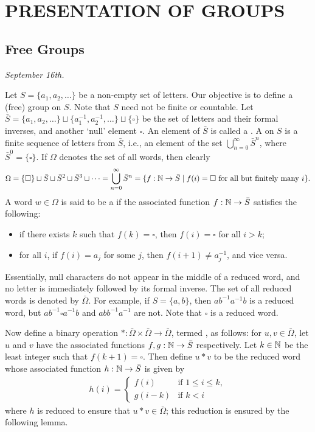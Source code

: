 \chapter{PRESENTATION OF GROUPS}


\section{Free Groups}

\textit{September 16th.}

Let $S = \{a_{1},a_{2},\ldots\}$ be a non-empty set of letters. Our objective is to define a (free) group on $S$. Note that $S$ need not be finite or countable. Let $\bar{S} = \{a_{1},a_{2},\ldots\} \sqcup \{a_{1}^{-1},a_{2}^{-1},\ldots\} \sqcup \{\square\}$ be the set of letters and their formal inverses, and another `null' element $\square$. An element of $\bar{S}$ is called a . A  on $S$ is a finite sequence of letters from $\bar{S}$, i.e., an element of the set $\bigcup_{n=0}^{\infty} \bar{S}^{n}$, where $\bar{S}^{0} = \{\square\}$. If $\Omega$ denotes the set of all words,
then clearly
\begin{align}
    \Omega = \{\square\} \sqcup \bar{S} \sqcup \bar{S}^{2} \sqcup \bar{S}^{3} \sqcup \cdots = \bigcup_{n=0}^{\infty} \bar{S}^{n} = \{f:\mathbb{N} \to \bar{S} \mid f(i) = \square \text{ for all but finitely many } i\}.
\end{align}
A word $w \in \Omega$ is said to be a  if the associated function $f:\mathbb{N} \to \bar{S}$ satisfies the following:
\begin{itemize}
    \item if there exists $k$ such that $f(k) = \square$, then $f(i) = \square$ for all $i > k$;
    \item for all $i$, if $f(i) = a_{j}$ for some $j$, then $f(i+1) \neq a_{j}^{-1}$, and vice versa.
\end{itemize}
Essentially, null characters do not appear in the middle of a reduced word, and no letter is immediately followed by its formal inverse. The set of all reduced words is denoted by $\bar{\Omega}$. For example, if $S = \{a,b\}$, then $ab^{-1}a^{-1}b$ is a reduced word, but $ab^{-1}\square a^{-1}b$ and $abb^{-1}a^{-1}$ are not. Note that $\square$ is a reduced word.

Now define a binary operation $\ast:\bar{\Omega}\times\bar{\Omega} \to \bar{\Omega}$, termed , as follows: for $u,v \in \bar{\Omega}$, let $u$ and $v$ have the associated functions $f,g:\mathbb{N} \to \bar{S}$ respectively. Let $k \in \mathbb{N}$ be the least integer such that $f(k+1) = \square$. Then define $u \ast v$ to be the reduced word whose associated function $h:\mathbb{N} \to \bar{S}$ is given by
\begin{align}
    h(i) = \begin{cases}
        f(i) & \text{if } 1 \leq i \leq k,\\
        g(i-k) & \text{if } k < i
    \end{cases}
\end{align}
where $h$ is reduced to ensure that $u \ast v \in \bar{\Omega}$; this reduction is ensured by the following lemma.

